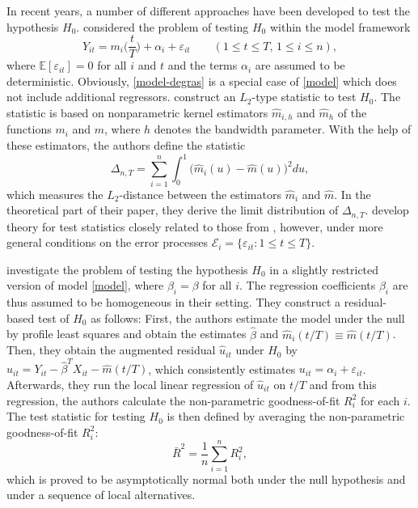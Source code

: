 \documentclass[a4paper,12pt]{article}
\begin{document}
In recent years, a number of different approaches have been developed to test the hypothesis $H_0$. \cite{DegrasWu2012} considered the problem of testing $H_0$ within the model framework
\begin{equation}\label{model-degras}
Y_{it} = m_i \Big( \frac{t}{T} \Big) + \alpha_i + \varepsilon_{it} \qquad (1 \le t \le T, \, 1 \le i \le n), 
\end{equation}
where $\mathbb{E}[\varepsilon_{it}] = 0$ for all $i$ and $t$ and the terms $\alpha_i$ are assumed to be deterministic. Obviously, \eqref{model-degras} is a special case of \eqref{model} which does not include additional regressors. \cite{DegrasWu2012} construct an $L_2$-type statistic to test $H_0$. The statistic is based on nonparametric kernel estimators $\hat{m}_{i,h}$ and $\hat{m}_h$ of the functions $m_i$ and $m$, where $h$ denotes the bandwidth parameter. With the help of these estimators, the authors define the statistic
\[ \Delta_{n,T} = \sum_{i=1}^n \int_0^1 \big(\hat{m}_i(u) - \hat{m}(u)\big)^2 du, \] 
which measures the $L_2$-distance between the estimators $\hat{m}_i$ and $\hat{m}$. In the theoretical part of their paper, they derive the limit distribution of $\Delta_{n,T}$. 
\cite{ChenWu2018} develop theory for test statistics closely related to those from \cite{DegrasWu2012}, however, under more general conditions on the error processes $\mathcal{E}_i = \{ \varepsilon_{it}: 1 \le t \le T \}$. 


\cite{Zhang2012} investigate the problem of testing the hypothesis $H_0$ in a slightly restricted version of model \eqref{model}, where $\beta_i = \beta$ for all $i$. The regression coefficients $\beta_i$ are thus assumed to be homogeneous in their setting. They construct a residual-based test of $H_0$ as follows: First, the authors estimate the model under the null by profile least squares and obtain the estimates $\widehat{\beta}$ and $\widehat{m}_i(t/T) \equiv \widehat{m}(t/T)$. Then, they obtain the augmented residual $\widehat{u}_{it}$ under $H_0$ by $\widehat{u}_{it} = Y_{it} - \widehat{\beta}^T X_{it} - \widehat{m}(t/T)$, which consistently estimates $u_{it} = \alpha_i + \varepsilon_{it}$. Afterwards, they run the local linear regression of $\widehat{u}_{it}$ on $t/T$ and from this regression, the authors calculate the non-parametric goodness-of-fit $R_i^2$ for each $i$. The test statistic for testing $H_0$ is then defined by averaging the non-parametric goodness-of-fit $R^2_i$:
\[ \bar{R}^2 = \frac{1}{n}\sum_{i=1}^nR_i^2,\]
which is proved to be asymptotically normal both under the null hypothesis and under a sequence of local alternatives.
\end{document}
